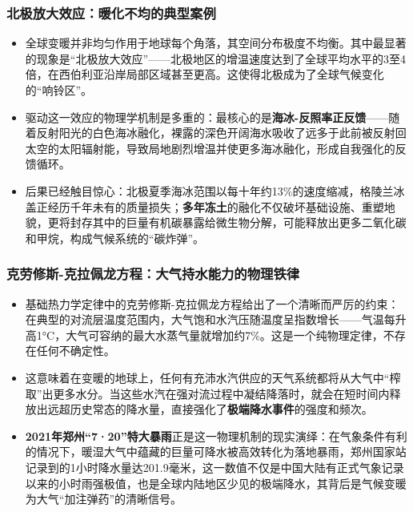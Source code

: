 \documentclass[11pt]{beamer}
\begin{document}
\begin{frame}
\frametitle{北极放大效应：暖化不均的典型案例}
\begin{itemize}
    \item 全球变暖并非均匀作用于地球每个角落，其空间分布极度不均衡。其中最显著的现象是\alert{“北极放大效应”}——北极地区的增温速度达到了全球平均水平的\alert{3至4倍}，在西伯利亚沿岸局部区域甚至更高。这使得北极成为了全球气候变化的“响铃区”。
    
    \item 驱动这一效应的物理学机制是多重的：最核心的是\textbf{海冰-反照率正反馈}——随着反射阳光的白色海冰融化，裸露的深色开阔海水吸收了远多于此前被反射回太空的太阳辐射能，导致局地剧烈增温并使更多海冰融化，形成自我强化的反馈循环。
    
    \item 后果已经触目惊心：北极夏季海冰范围以每十年约13\%的速度缩减，格陵兰冰盖正经历千年未有的质量损失；\textbf{多年冻土}的融化不仅破坏基础设施、重塑地貌，更将封存其中的巨量有机碳暴露给微生物分解，可能释放出更多二氧化碳和甲烷，构成气候系统的“碳炸弹”。
\end{itemize}
\end{frame}

\begin{frame}
\frametitle{克劳修斯-克拉佩龙方程：大气持水能力的物理铁律}
\begin{itemize}
    \item 基础热力学定律中的\alert{克劳修斯-克拉佩龙方程}给出了一个清晰而严厉的约束：在典型的对流层温度范围内，大气饱和水汽压随温度呈指数增长——气温每升高\alert{1°C}，大气可容纳的最大水蒸气量就增加约\alert{7\%}。这是一个纯物理定律，不存在任何不确定性。
    
    \item 这意味着在变暖的地球上，任何有充沛水汽供应的天气系统都将从大气中“榨取”出更多水分。当这些水汽在强对流过程中凝结降落时，就会在短时间内释放出远超历史常态的降水量，直接强化了\textbf{极端降水事件}的强度和频次。
    
    \item \textbf{2021年郑州“7·20”特大暴雨}正是这一物理机制的现实演绎：在气象条件有利的情况下，暖湿大气中蕴藏的巨量可降水被高效转化为落地暴雨，郑州国家站记录到的\alert{1小时降水量达201.9毫米}，这一数值不仅是中国大陆有正式气象记录以来的小时雨强极值，也是全球内陆地区少见的极端降水，其背后是气候变暖为大气“加注弹药”的清晰信号。
\end{itemize}
\end{frame}
\end{document}
